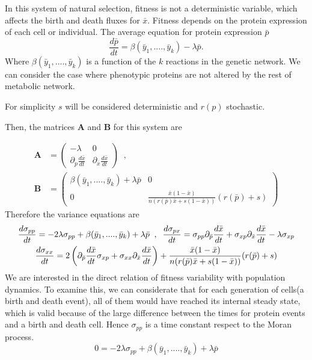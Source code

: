 In this system of natural selection, fitness is not a deterministic variable, which affects the birth and death fluxes for $\bar{ x}$. Fitness depends on the protein expression  of each cell or individual.  The average equation for protein expression $\bar{p}$ 
\begin{equation}
	\frac{d \bar{p}}{dt}=\beta(\bar{y}_{1}, ...., \bar{y}_{k}) - \lambda \bar{p}.
\end{equation} 
Where $\beta(\bar{y}_{1}, ...., \bar{y}_{k})$ is a function of the $k$ reactions in the genetic network. We can consider the case where phenotypic proteins are not altered by the rest of metabolic network. 

For simplicity $s$ will be considered deterministic and $r(p)$ stochastic. 

Then, the matrices $\mathbf{A}$ and $\mathbf{B}$ for this system are

\begin{equation}
\begin{split}
\mathbf{A}&=\begin{pmatrix} -\lambda & 0 \\
\partial_{p}\frac{d\bar{x}}{dt} & \partial_{\bar{x}}\frac{d\bar{ x}}{dt}
\end{pmatrix}\;\; , \\ \mathbf{B}&=\begin{pmatrix}\beta(\bar{y}_{1}, ...., \bar{y}_{k}) + \lambda\bar{p} & 0 \\
0 & \frac{\bar{x}(1-\bar{x})}{n(r(\bar{p} )\bar{x}+ s(1-\bar{x}))}(r(\bar{p})+ s)
\end{pmatrix}
\end{split}
\end{equation}
Therefore the variance equations are
\begin{gather}
\frac{d\sigma_{pp}}{dt}=-2\lambda\sigma_{pp}+\beta(\bar{y}_{1}, ...., \bar{y}_{k})+ \lambda\bar{p} \;\; , \;\; \frac{d\sigma_{px}}{dt}=\sigma_{pp}\partial_{\bar{ p}}\frac{d\bar{ x}}{dt} + \sigma_{xp}\partial_{\bar{x}}\frac{d\bar{x}}{dt} - \lambda\sigma_{xp} \notag \\
\frac{d\sigma_{xx}}{dt}=2\left(\partial_{\bar{p}}\frac{d\bar{x }}{dt} \sigma_{xp} + \sigma_{xx}\partial_{\bar{x}}\frac{d\bar{ x}}{dt} \right) + \frac{\bar{x}(1-\bar{x})}{n(r(\bar{p})\bar{x}+ s(1-\bar{x}))}(r(\bar{p})+ s)
\end{gather}
We are interested in the direct relation of fitness variability with population dynamics. To examine this, we can considerate that for each generation of cells(a birth and death event), all of them would have reached its internal steady state, which is valid  because of the large difference between the times for protein events and a birth and death cell. Hence $\sigma_{pp}$ is a time constant respect to the Moran process.
\begin{equation}
0=-2\lambda\sigma_{pp}+\beta(\bar{y}_{1}, ...., \bar{y}_{k})+ \lambda\bar{p} 
\end{equation} 
 


